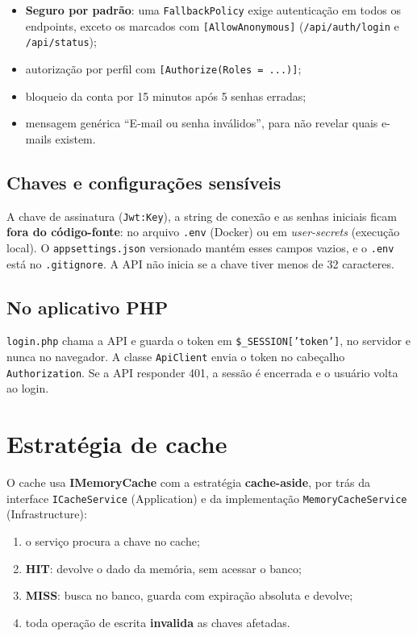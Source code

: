 \documentclass[12pt,a4paper]{article}
\newcommand{\cod}[1]{\texttt{#1}}
\begin{document}
\begin{itemize}[itemsep=2pt]
  \item \textbf{Seguro por padrão}: uma \cod{FallbackPolicy} exige autenticação em todos os
        endpoints, exceto os marcados com \cod{[AllowAnonymous]} (\cod{/api/auth/login} e \cod{/api/status});
  \item autorização por perfil com \cod{[Authorize(Roles = ...)]};
  \item bloqueio da conta por 15 minutos após 5 senhas erradas;
  \item mensagem genérica ``E-mail ou senha inválidos'', para não revelar quais e-mails existem.
\end{itemize}

\subsection{Chaves e configurações sensíveis}

A chave de assinatura (\cod{Jwt:Key}), a string de conexão e as senhas iniciais ficam
\textbf{fora do código-fonte}: no arquivo \cod{.env} (Docker) ou em \textit{user-secrets}
(execução local). O \cod{appsettings.json} versionado mantém esses campos vazios, e o
\cod{.env} está no \cod{.gitignore}. A API não inicia se a chave tiver menos de 32 caracteres.

\subsection{No aplicativo PHP}

\cod{login.php} chama a API e guarda o token em \cod{\$\_SESSION['token']}, no servidor e nunca
no navegador. A classe \cod{ApiClient} envia o token no cabeçalho \cod{Authorization}. Se a API
responder 401, a sessão é encerrada e o usuário volta ao login.

\section{Estratégia de cache}

O cache usa \textbf{IMemoryCache} com a estratégia \textbf{cache-aside}, por trás da interface
\cod{ICacheService} (Application) e da implementação \cod{MemoryCacheService} (Infrastructure):

\begin{enumerate}[itemsep=2pt]
  \item o serviço procura a chave no cache;
  \item \textbf{HIT}: devolve o dado da memória, sem acessar o banco;
  \item \textbf{MISS}: busca no banco, guarda com expiração absoluta e devolve;
  \item toda operação de escrita \textbf{invalida} as chaves afetadas.
\end{enumerate}
\end{document}
